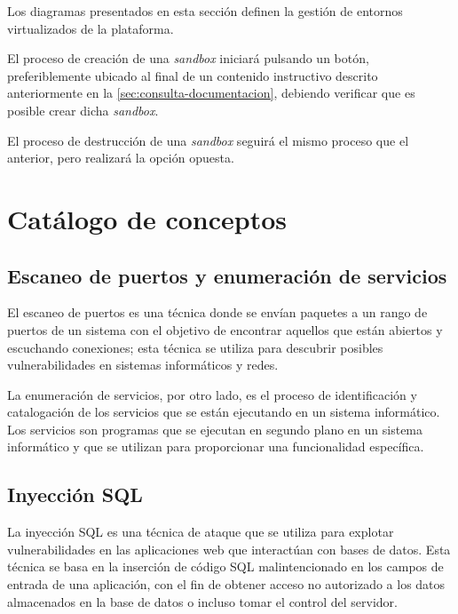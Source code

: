             Los diagramas presentados en esta sección definen la gestión de entornos virtualizados de la plataforma.
            
            El proceso de creación de una \textit{sandbox} iniciará pulsando un botón, preferiblemente ubicado al final de un contenido instructivo descrito anteriormente en la \autoref{sec:consulta-documentacion}, debiendo verificar que es posible crear dicha \textit{sandbox}.
            
            El proceso de destrucción de una \textit{sandbox} seguirá el mismo proceso que el anterior, pero realizará la opción opuesta.
            
            \newpage
        
        
    \section{Catálogo de conceptos}
    
        \subsection{Escaneo de puertos y enumeración de servicios}
        
            El escaneo de puertos es una técnica donde se envían paquetes a un rango de puertos de un sistema con el objetivo de encontrar aquellos que están abiertos y escuchando conexiones; esta técnica se utiliza para descubrir posibles vulnerabilidades en sistemas informáticos y redes.
            
            La enumeración de servicios, por otro lado, es el proceso de identificación y catalogación de los servicios que se están ejecutando en un sistema informático. Los servicios son programas que se ejecutan en segundo plano en un sistema informático y que se utilizan para proporcionar una funcionalidad específica.
            
            
        \subsection{Inyección SQL}
            
            La inyección SQL es una técnica de ataque que se utiliza para explotar vulnerabilidades en las aplicaciones web que interactúan con bases de datos. Esta técnica se basa en la inserción de código SQL malintencionado en los campos de entrada de una aplicación, con el fin de obtener acceso no autorizado a los datos almacenados en la base de datos o incluso tomar el control del servidor.
            
